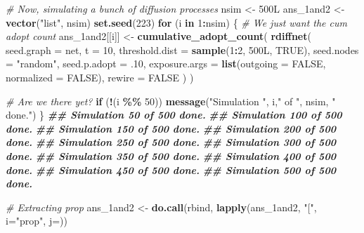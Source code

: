 \documentclass[
]{book}
\newenvironment{Shaded}{\begin{snugshade}}{\end{snugshade}}
\newcommand{\AttributeTok}[1]{\textcolor[rgb]{0.13,0.29,0.53}{#1}}
\newcommand{\CommentTok}[1]{\textcolor[rgb]{0.56,0.35,0.01}{\textit{#1}}}
\newcommand{\ConstantTok}[1]{\textcolor[rgb]{0.56,0.35,0.01}{#1}}
\newcommand{\ControlFlowTok}[1]{\textcolor[rgb]{0.13,0.29,0.53}{\textbf{#1}}}
\newcommand{\DecValTok}[1]{\textcolor[rgb]{0.00,0.00,0.81}{#1}}
\newcommand{\DocumentationTok}[1]{\textcolor[rgb]{0.56,0.35,0.01}{\textbf{\textit{#1}}}}
\newcommand{\FunctionTok}[1]{\textcolor[rgb]{0.13,0.29,0.53}{\textbf{#1}}}
\newcommand{\NormalTok}[1]{#1}
\newcommand{\OtherTok}[1]{\textcolor[rgb]{0.56,0.35,0.01}{#1}}
\newcommand{\SpecialCharTok}[1]{\textcolor[rgb]{0.81,0.36,0.00}{\textbf{#1}}}
\newcommand{\StringTok}[1]{\textcolor[rgb]{0.31,0.60,0.02}{#1}}
\begin{document}
\begin{Shaded}
\begin{Highlighting}[]

\CommentTok{\# Now, simulating a bunch of diffusion processes}
\NormalTok{nsim }\OtherTok{\textless{}{-}}\NormalTok{ 500L}
\NormalTok{ans\_1and2 }\OtherTok{\textless{}{-}} \FunctionTok{vector}\NormalTok{(}\StringTok{"list"}\NormalTok{, nsim)}
\FunctionTok{set.seed}\NormalTok{(}\DecValTok{223}\NormalTok{)}
\ControlFlowTok{for}\NormalTok{ (i }\ControlFlowTok{in} \DecValTok{1}\SpecialCharTok{:}\NormalTok{nsim) \{}
  \CommentTok{\# We just want the cum adopt count}
\NormalTok{  ans\_1and2[[i]] }\OtherTok{\textless{}{-}} 
    \FunctionTok{cumulative\_adopt\_count}\NormalTok{(}
      \FunctionTok{rdiffnet}\NormalTok{(}
        \AttributeTok{seed.graph =}\NormalTok{ net,}
        \AttributeTok{t =} \DecValTok{10}\NormalTok{,}
        \AttributeTok{threshold.dist =} \FunctionTok{sample}\NormalTok{(}\DecValTok{1}\SpecialCharTok{:}\DecValTok{2}\NormalTok{, 500L, }\ConstantTok{TRUE}\NormalTok{),}
        \AttributeTok{seed.nodes =} \StringTok{"random"}\NormalTok{,}
        \AttributeTok{seed.p.adopt =}\NormalTok{ .}\DecValTok{10}\NormalTok{,}
        \AttributeTok{exposure.args =} \FunctionTok{list}\NormalTok{(}\AttributeTok{outgoing =} \ConstantTok{FALSE}\NormalTok{, }\AttributeTok{normalized =} \ConstantTok{FALSE}\NormalTok{),}
        \AttributeTok{rewire =} \ConstantTok{FALSE}
\NormalTok{        )}
\NormalTok{      )}
  
  \CommentTok{\# Are we there yet?}
  \ControlFlowTok{if}\NormalTok{ (}\SpecialCharTok{!}\NormalTok{(i }\SpecialCharTok{\%\%} \DecValTok{50}\NormalTok{))}
    \FunctionTok{message}\NormalTok{(}\StringTok{"Simulation "}\NormalTok{, i,}\StringTok{" of "}\NormalTok{, nsim, }\StringTok{" done."}\NormalTok{)}
\NormalTok{\}}
\DocumentationTok{\#\# Simulation 50 of 500 done.}
\DocumentationTok{\#\# Simulation 100 of 500 done.}
\DocumentationTok{\#\# Simulation 150 of 500 done.}
\DocumentationTok{\#\# Simulation 200 of 500 done.}
\DocumentationTok{\#\# Simulation 250 of 500 done.}
\DocumentationTok{\#\# Simulation 300 of 500 done.}
\DocumentationTok{\#\# Simulation 350 of 500 done.}
\DocumentationTok{\#\# Simulation 400 of 500 done.}
\DocumentationTok{\#\# Simulation 450 of 500 done.}
\DocumentationTok{\#\# Simulation 500 of 500 done.}

\CommentTok{\# Extracting prop}
\NormalTok{ans\_1and2 }\OtherTok{\textless{}{-}} \FunctionTok{do.call}\NormalTok{(rbind, }\FunctionTok{lapply}\NormalTok{(ans\_1and2, }\StringTok{"["}\NormalTok{, }\AttributeTok{i=}\StringTok{"prop"}\NormalTok{, }\AttributeTok{j=}\NormalTok{))}


\end{Highlighting}
\end{Shaded}
\end{document}

